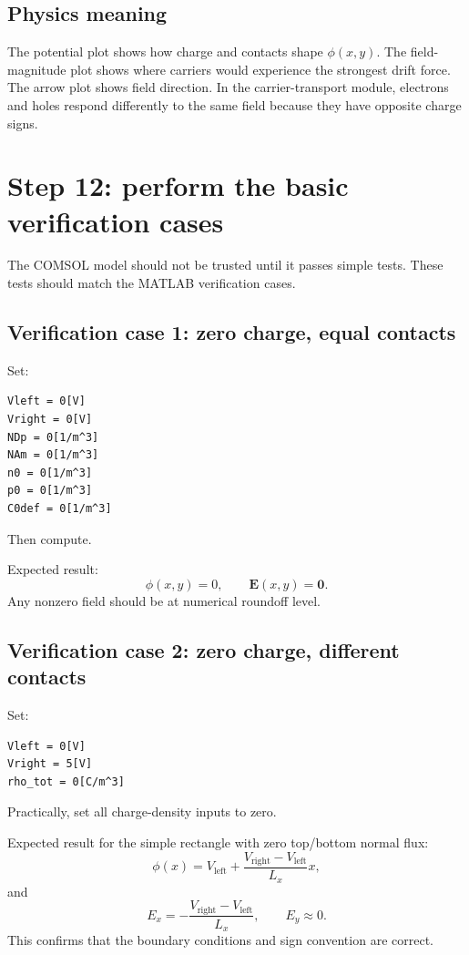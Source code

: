 \documentclass[11pt]{article}
\newcommand{\Evec}{\mathbf{E}}
\begin{document}
\subsection{Physics meaning}

The potential plot shows how charge and contacts shape $\phi(x,y)$. The field-magnitude plot shows where carriers would experience the strongest drift force. The arrow plot shows field direction. In the carrier-transport module, electrons and holes respond differently to the same field because they have opposite charge signs.

\section{Step 12: perform the basic verification cases}

The COMSOL model should not be trusted until it passes simple tests. These tests should match the MATLAB verification cases.

\subsection{Verification case 1: zero charge, equal contacts}

Set:
\begin{verbatim}
Vleft = 0[V]
Vright = 0[V]
NDp = 0[1/m^3]
NAm = 0[1/m^3]
n0 = 0[1/m^3]
p0 = 0[1/m^3]
C0def = 0[1/m^3]
\end{verbatim}
Then compute.

Expected result:
\begin{equation}
\phi(x,y)=0,\qquad \Evec(x,y)=\mathbf{0}.
\end{equation}
Any nonzero field should be at numerical roundoff level.

\subsection{Verification case 2: zero charge, different contacts}

Set:
\begin{verbatim}
Vleft = 0[V]
Vright = 5[V]
rho_tot = 0[C/m^3]
\end{verbatim}
Practically, set all charge-density inputs to zero.

Expected result for the simple rectangle with zero top/bottom normal flux:
\begin{equation}
\phi(x)=V_{\mathrm{left}}+\frac{V_{\mathrm{right}}-V_{\mathrm{left}}}{L_x}x,
\end{equation}
and
\begin{equation}
E_x=-\frac{V_{\mathrm{right}}-V_{\mathrm{left}}}{L_x},\qquad E_y\approx 0.
\end{equation}
This confirms that the boundary conditions and sign convention are correct.
\end{document}
